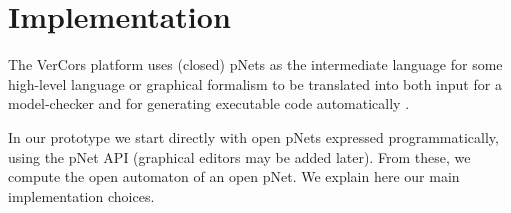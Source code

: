 \documentclass{lncs/llncs}
\begin{document}
\section{Implementation}
\label{section:implementation}
The VerCors platform uses (closed) pNets as the intermediate language
for some high-level language or graphical formalism to be translated
into both input for a 
model-checker and for generating executable code automatically \cite{HKM-FASE16}.

In our prototype we start directly with open pNets expressed
programmatically, using the pNet API (graphical editors may be added
later). From these, we compute
the open automaton of an open pNet. We explain here our main
implementation choices.
%
\end{document}
